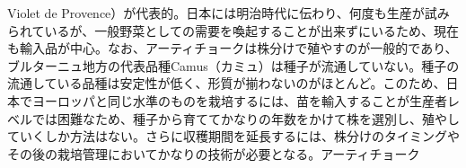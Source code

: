 \begin{recette}
{{{{  Violet de
  Provence）が代表的。日本には明治時代に伝わり、何度も生産が試みられているが、一般野菜としての需要を喚起することが出来ずにいるため、現在も輸入品が中心。なお、アーティチョークは株分けで殖やすのが一般的であり、ブルターニュ地方の代表品種Camus（カミュ）は種子が流通していない。種子の流通している品種は安定性が低く、形質が揃わないのがほとんど。このため、日本でヨーロッパと同じ水準のものを栽培するには、苗を輸入することが生産者レベルでは困難なため、種子から育ててかなりの年数をかけて株を選別し、殖やしていくしか方法はない。さらに収穫期間を延長するには、株分けのタイミングやその後の栽培管理においてかなりの技術が必要となる。}}{アーティチョーク}}\label{artichauts}}



\end{recette}

